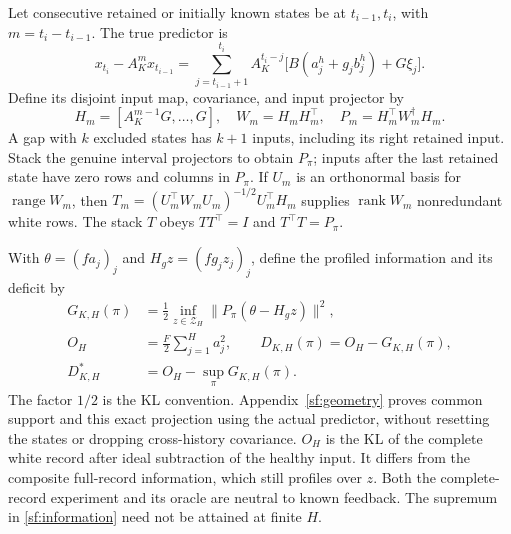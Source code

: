 \documentclass[journal]{IEEEtran}
\begin{document}
Let consecutive retained or initially known states be at $t_{i-1},t_i$,
with $m=t_i-t_{i-1}$. The true predictor is
\begin{equation}\label{sf:predictor}
x_{t_i}-A_K^m x_{t_{i-1}}
=\sum_{j=t_{i-1}+1}^{t_i}A_K^{t_i-j}
\bigl[B(a_j^h+g_jb_j^h)+G\xi_j\bigr].
\end{equation}
Define its disjoint input map, covariance, and input projector by
\begin{equation}\label{sf:interval}
H_m=[A_K^{m-1}G,\ldots,G],\quad W_m=H_mH_m^\top,\quad
P_m=H_m^\top W_m^\dagger H_m .
\end{equation}
A gap with $k$ excluded states has $k+1$ inputs, including its right retained
input. Stack the genuine interval projectors to obtain $P_\pi$; inputs after
the last retained state have zero rows and columns in $P_\pi$.
If $U_m$ is an orthonormal basis for $\operatorname{range}W_m$, then
$T_m=(U_m^\top W_mU_m)^{-1/2}U_m^\top H_m$ supplies
$\operatorname{rank}W_m$ nonredundant white rows. The stack $T$ obeys
$TT^\top=I$ and $T^\top T=P_\pi$.

With $\theta=(fa_j)_j$ and $H_gz=(fg_jz_j)_j$, define the profiled information
and its deficit by
\begin{equation}\label{sf:information}
\begin{split}
G_{K,H}(\pi)&=\tfrac12\inf_{z\in\mathcal Z_H}
\|P_\pi(\theta-H_gz)\|^2,\\
O_H&=\tfrac F2\sum_{j=1}^Ha_j^2,\qquad
D_{K,H}(\pi)=O_H-G_{K,H}(\pi),\\
D_{K,H}^*&=O_H-\sup_\pi G_{K,H}(\pi).
\end{split}
\end{equation}
The factor $1/2$ is the KL convention. Appendix~\ref{sf:geometry} proves
common support and this exact projection using the actual predictor,
without resetting the states or dropping cross-history covariance.
$O_H$ is the KL of the complete white record after ideal subtraction of
the healthy input. It differs from the composite full-record information,
which still profiles over $z$. Both the complete-record experiment and its
oracle are neutral to known feedback. The supremum in
\eqref{sf:information} need not be attained at finite $H$.
\end{document}
